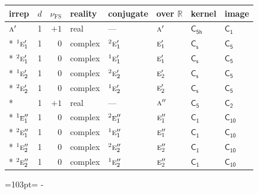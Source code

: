 \documentclass[10pt,a4paper]{article}
\newcommand{\needspace}[1]{\par\penalty-100\begingroup\dimen0=#1\relax\dimen2=\pagegoal
  \advance\dimen2-\pagetotal\ifdim\dimen0>\dimen2\relax\ifdim\dimen2>0pt\vfil\break\fi\fi
  \endgroup}
\numberwithin{equation}{section}
\newcommand{\grp}[1]{\mathsf{#1}}
\newcommand{\irr}[1]{\text{\normalfont\scshape #1}}
\newcommand{\conjpair}[1]{{}^{#1}}
\newcommand{\detbox}[1]{{\setlength{\fboxsep}{1pt}\fbox{#1}}}
\newcommand{\fsind}{\nu_{\mathrm{FS}}}
\begin{document}
{\small\renewcommand{\arraystretch}{1.25}\setlength{\tabcolsep}{4pt}\begin{longtable}{@{}lrrlllll@{}}\toprule
irrep & $d$ & $\fsind$ & reality & conjugate & over $\mathbb{R}$ & kernel & image\\\midrule\endhead
\bottomrule\endfoot\endlastfoot
$\irr{a}'$ & 1 & $+1$ & real & --- & $\irr{a}'$ & \href{C5h.pdf}{$\grp{C_{5h}}$} & \href{C1.pdf}{$\grp{C_{1}}$}\\*
$\conjpair{1}\irr{e}_{1}'$ & 1 & $0$ & complex & $\conjpair{2}\irr{e}_{1}'$ & $\irr{e}_{1}'$ & \href{C1v.pdf}{$\grp{C_{s}}$} & \href{C5.pdf}{$\grp{C_{5}}$}\\*
$\conjpair{2}\irr{e}_{1}'$ & 1 & $0$ & complex & $\conjpair{1}\irr{e}_{1}'$ & $\irr{e}_{1}'$ & \href{C1v.pdf}{$\grp{C_{s}}$} & \href{C5.pdf}{$\grp{C_{5}}$}\\*
$\conjpair{1}\irr{e}_{2}'$ & 1 & $0$ & complex & $\conjpair{2}\irr{e}_{2}'$ & $\irr{e}_{2}'$ & \href{C1v.pdf}{$\grp{C_{s}}$} & \href{C5.pdf}{$\grp{C_{5}}$}\\*
$\conjpair{2}\irr{e}_{2}'$ & 1 & $0$ & complex & $\conjpair{1}\irr{e}_{2}'$ & $\irr{e}_{2}'$ & \href{C1v.pdf}{$\grp{C_{s}}$} & \href{C5.pdf}{$\grp{C_{5}}$}\\*
\detbox{$\irr{a}''$} & 1 & $+1$ & real & --- & $\irr{a}''$ & \href{C5.pdf}{$\grp{C_{5}}$} & \href{C2.pdf}{$\grp{C_{2}}$}\\*
$\conjpair{1}\irr{e}_{1}''$ & 1 & $0$ & complex & $\conjpair{2}\irr{e}_{1}''$ & $\irr{e}_{1}''$ & \href{C1.pdf}{$\grp{C_{1}}$} & \href{C10.pdf}{$\grp{C_{10}}$}\\*
$\conjpair{2}\irr{e}_{1}''$ & 1 & $0$ & complex & $\conjpair{1}\irr{e}_{1}''$ & $\irr{e}_{1}''$ & \href{C1.pdf}{$\grp{C_{1}}$} & \href{C10.pdf}{$\grp{C_{10}}$}\\*
$\conjpair{1}\irr{e}_{2}''$ & 1 & $0$ & complex & $\conjpair{2}\irr{e}_{2}''$ & $\irr{e}_{2}''$ & \href{C1.pdf}{$\grp{C_{1}}$} & \href{C10.pdf}{$\grp{C_{10}}$}\\*
$\conjpair{2}\irr{e}_{2}''$ & 1 & $0$ & complex & $\conjpair{1}\irr{e}_{2}''$ & $\irr{e}_{2}''$ & \href{C1.pdf}{$\grp{C_{1}}$} & \href{C10.pdf}{$\grp{C_{10}}$}\\
\bottomrule\end{longtable}}
\needspace{103pt}
\end{document}
